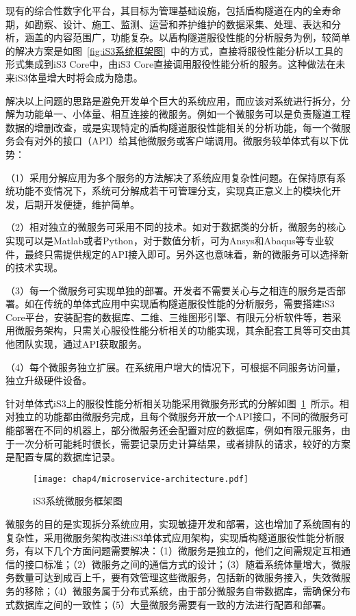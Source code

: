 现有的综合性数字化平台，其目标为管理基础设施，包括盾构隧道在内的全寿命期，如勘察、设计、施工、监测、运营和养护维护的数据采集、处理、表达和分析，涵盖的内容范围广，功能复杂。以盾构隧道服役性能的分析服务为例，较简单的解决方案是如图~\ref{fig:iS3系统框架图}~中的方式，直接将服役性能分析以工具的形式集成到iS3 Core中，由iS3 Core直接调用服役性能分析的服务。这种做法在未来iS3体量增大时将会成为隐患。

解决以上问题的思路是避免开发单个巨大的系统应用，而应该对系统进行拆分，分解为功能单一、小体量、相互连接的微服务。例如一个微服务可以是负责隧道工程数据的增删改查，或是实现特定的盾构隧道服役性能相关的分析功能，每一个微服务会有对外的接口（API）给其他微服务或客户端调用。微服务较单体式有以下优势：

（1）采用分解应用为多个服务的方法解决了系统应用复杂性问题。在保持原有系统功能不变情况下，系统可分解成若干可管理分支，实现真正意义上的模块化开发，后期开发便捷，维护简单。

（2）相对独立的微服务可采用不同的技术。如对于数据类的分析，微服务的核心实现可以是Matlab或者Python，对于数值分析，可为Ansys和Abaqus等专业软件，最终只需提供规定的API接入即可。另外这也意味着，新的微服务可以选择新的技术实现。

（3）每一个微服务可实现单独的部署。开发者不需要关心与之相连的服务是否部署。如在传统的单体式应用中实现盾构隧道服役性能的分析服务，需要搭建iS3 Core平台，安装配套的数据库、二维、三维图形引擎、有限元分析软件等，若采用微服务架构，只需关心服役性能分析相关的功能实现，其余配套工具等可交由其他团队实现，通过API获取服务。

（4）每个微服务独立扩展。在系统用户增大的情况下，可根据不同服务访问量，独立升级硬件设备。

针对单体式iS3上的服役性能分析相关功能采用微服务形式的分解如图~\ref{fig:iS3系统微服务框架图}~所示。相对独立的功能都由微服务完成，且每个微服务开放一个API接口，不同的微服务可能部署在不同的机器上，部分微服务还会配置对应的数据库，例如有限元服务，由于一次分析可能耗时很长，需要记录历史计算结果，或者排队的请求，较好的方案是配置专属的数据库记录。

\begin{figure}[htb!]
    \centering
    \texttt{[image: chap4/microservice-architecture.pdf]}
    \caption{iS3系统微服务框架图}
    \label{fig:iS3系统微服务框架图}
\end{figure}

微服务的目的是实现拆分系统应用，实现敏捷开发和部署，这也增加了系统固有的复杂性，采用微服务架构改进iS3单体式应用架构，实现盾构隧道服役性能分析服务，有以下几个方面问题需要解决：（1）微服务是独立的，他们之间需规定互相通信的接口标准；（2）微服务之间的通信方式的设计；（3）随着系统体量增大，微服务数量可达到成百上千，要有效管理这些微服务，包括新的微服务接入，失效微服务的移除；（4）微服务属于分布式系统，由于部分微服务自带数据库，需确保分布式数据库之间的一致性；（5）大量微服务需要有一致的方法进行配置和部署。


